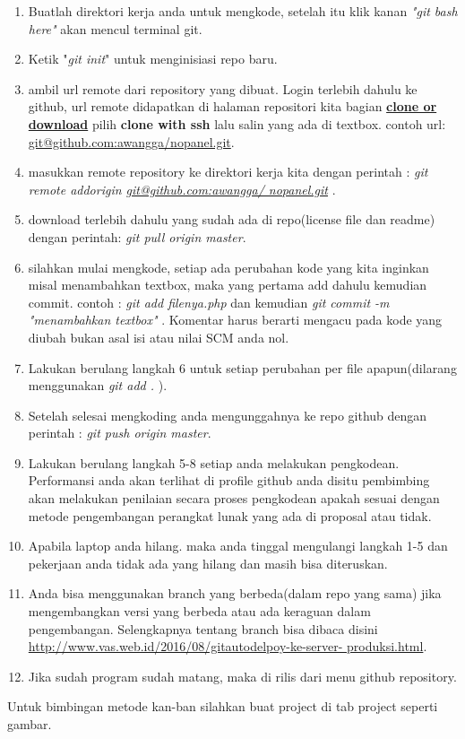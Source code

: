 \begin{enumerate}
\item Buatlah direktori kerja anda untuk mengkode, setelah itu klik kanan 				\textit{"git bash here"} akan mencul terminal git.
\item Ketik "\textit{git init}" untuk menginisiasi repo baru.
\item ambil url remote dari repository yang dibuat. Login terlebih dahulu 		ke github, url remote didapatkan di halaman repositori kita bagian 			\textbf{\underline{clone or download}} pilih \textbf{clone with ssh} 		lalu salin yang ada di textbox. contoh url: 								\url{git@github.com:awangga/nopanel.git}.

\item masukkan remote repository ke direktori kerja kita dengan perintah : 	  \textit{git remote addorigin \url{git@github.com:awangga/						nopanel.git}} .

\item download terlebih dahulu yang sudah ada di repo(license file dan 				readme) dengan perintah: \textit{git pull origin master}.

\item silahkan mulai mengkode, setiap ada perubahan kode yang kita 					inginkan misal menambahkan textbox, maka yang pertama add dahulu 			kemudian commit. contoh : \textit{git add filenya.php} dan 					kemudian \textit{git commit -m "menambahkan textbox"} . Komentar 			harus berarti mengacu pada kode yang diubah bukan asal isi atau 			nilai SCM anda nol.

\item Lakukan berulang langkah 6 untuk setiap perubahan per file 					apapun(dilarang menggunakan \textit{git add . }).

\item Setelah selesai mengkoding anda mengunggahnya ke repo github dengan 			perintah : \textit{git push origin master}.

\item Lakukan berulang langkah 5-8 setiap anda melakukan pengkodean. 				Performansi anda akan terlihat di profile github anda disitu 				pembimbing akan melakukan penilaian secara proses pengkodean 				apakah sesuai dengan metode pengembangan perangkat lunak yang ada 			di proposal atau tidak.

\item Apabila laptop anda hilang. maka anda tinggal mengulangi langkah 1-5 		dan pekerjaan anda tidak ada yang hilang dan masih bisa 					diteruskan.

\item Anda bisa menggunakan branch yang berbeda(dalam repo yang sama) jika
		mengembangkan versi yang berbeda atau ada keraguan dalam 					pengembangan. Selengkapnya tentang branch bisa dibaca disini 				\url{http://www.vas.web.id/2016/08/gitautodelpoy-ke-server-					produksi.html}.
		
\item Jika sudah program sudah matang, maka di rilis dari menu github 				repository.
\end{enumerate}
Untuk	bimbingan	metode	kan-ban	silahkan	buat	project	di	tab	project	seperti	gambar.


